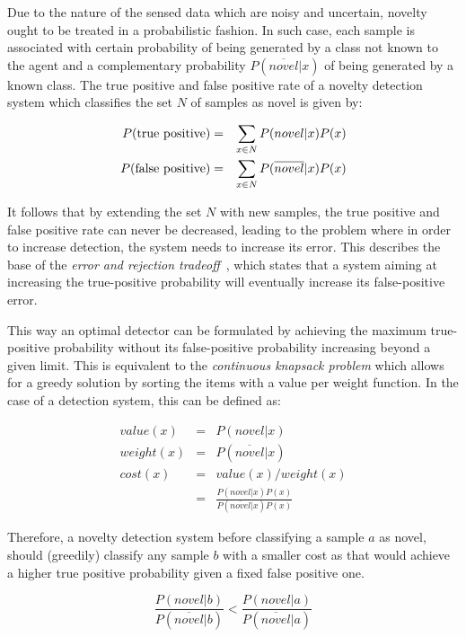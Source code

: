 \documentclass[runningheads,a4paper]{llncs}
\begin{document}
Due to the nature of the sensed data which are noisy and uncertain, novelty ought to be
treated in a probabilistic fashion. In such case, each sample is associated with certain probability
of being generated by a class not known to the agent and a complementary probability $P(\overline{novel}|x)$
of being generated by a known class.
The true positive and false positive rate of a novelty detection system which classifies
the set $N$ of samples as novel is given by:

\begin{eqnarray}
P(\textnormal{true positive})  &=& \sum_{x \in N}{P(novel|x)P(x)} \\
P(\textnormal{false positive}) &=& \sum_{x \in N}{P(\overline{novel}|x)P(x})
\end{eqnarray}

It follows that by extending the set $N$ with new samples, the true positive and
false positive rate can never be decreased, leading to the problem where in order
to increase detection, the system needs to increase its error. This describes the
base of the \emph{error and rejection tradeoff}~\cite{chow1970optimum}, which
states that a system aiming at increasing the true-positive probability will 
eventually increase its false-positive error.

This way an optimal detector can be formulated by achieving the maximum true-positive
probability without its false-positive probability increasing beyond a given limit.
This is equivalent to the \emph{continuous knapsack problem} which allows for a greedy
solution by sorting the items with a value per weight function. In the case of 
a detection system, this can be defined as:

\begin{eqnarray}
value(x)  &=& P(novel|x) \\
weight(x) &=& P(\overline{novel}|x) \\
cost(x)   &=& value(x)/weight(x) \\
          &=& \frac{P(novel|x)P(x)}{P(\overline{novel}|x)P(x)}
\end{eqnarray}

Therefore, a novelty detection system before classifying a sample $a$ as novel, should (greedily)
classify any sample $b$ with a smaller cost as that would achieve a higher true positive probability 
given a fixed false positive one.

\begin{equation}
\label{eq:knapsack}
\frac{P(novel|b)}{P(\overline{novel}|b)} < \frac{P(novel|a)}{P(\overline{novel}|a)}
\end{equation}
\end{document}
